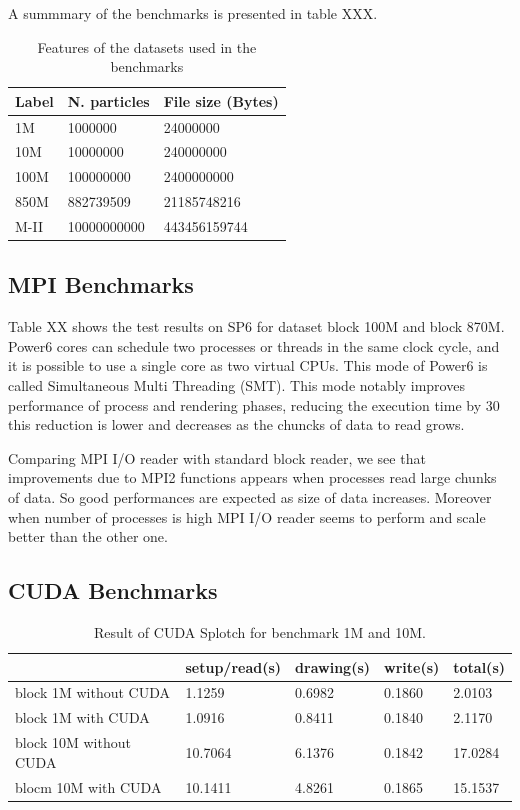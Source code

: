 A summmary of the benchmarks is presented in table XXX. 

\begin{table}
\caption{Features of the datasets used in the benchmarks}
\begin{tabular}{|l|l|l|}
\hline
Label & 	N. particles & 	File size (Bytes)  \\
\hline
1M   & 	1000000   & 24000000 \\
\hline
10M  & 	10000000  & 240000000 \\
\hline
100M & 	100000000 & 2400000000 \\
\hline
850M & 	882739509 & 21185748216 \\
\hline
M-II & 	10000000000 & 	443456159744 \\
\hline
\end{tabular}
\end{table}


\subsection{MPI Benchmarks}

Table XX shows the test results on SP6 for dataset block 100M and block 870M.
Power6 cores can schedule two processes or threads in the same clock cycle, 
and it is possible to use a single core as two virtual CPUs. This mode of Power6 
is called Simultaneous Multi Threading (SMT).  This mode notably improves performance 
of process and rendering phases, reducing the execution time by 30%
this reduction is lower and decreases as the chuncks of data to read grows.

Comparing MPI I/O reader with standard block reader, we see that improvements due to MPI2 functions 
appears when processes read large chunks of data. So good performances are expected as size of data increases.
Moreover when number of processes is high MPI I/O reader seems to perform and scale better than the other one.
   

\subsection{CUDA Benchmarks}

\begin{table}
\caption{Result of CUDA Splotch for benchmark 1M and 10M.}
\begin{tabular}{|l|l|l|l|l|}
\hline
	& setup/read(s) & 	drawing(s) & 	write(s) & 	total(s) \\
\hline
block 1M without CUDA & 	1.1259 & 	0.6982 & 	0.1860 & 	2.0103 \\
\hline
block 1M with CUDA & 	1.0916 & 	0.8411 & 	0.1840 & 	2.1170 \\
\hline
block 10M without CUDA & 	10.7064 & 	6.1376 & 	0.1842 & 	17.0284 \\
\hline
blocm 10M with CUDA & 	10.1411 & 	4.8261 & 	0.1865 & 	15.1537 \\
\hline
\end{tabular}
\end{table}

